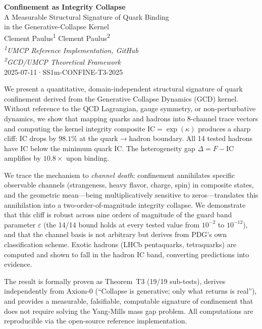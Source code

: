 \documentclass[11pt,a4paper]{article}
\newcommand{\WeldID}{SS1m-CONFINE-T3-2025}
\newcommand{\RevisionDate}{2025-07-11}
\theoremstyle{plain}
\theoremstyle{definition}
\theoremstyle{remark}
\newcommand{\eps}{\varepsilon}
\newcommand{\IC}{\mathrm{IC}}
\begin{document}

\begin{center}
  {\LARGE\bfseries Confinement as Integrity Collapse}\\[6pt]
  {\large A Measurable Structural Signature of Quark Binding\\
   in the Generative-Collapse Kernel}\\[14pt]
  {\normalsize
    Clement Paulus\textsuperscript{1}\enspace
    Clement Paulus\textsuperscript{2}}\\[4pt]
  {\small\itshape
    \textsuperscript{1}UMCP Reference Implementation, GitHub\\
    \textsuperscript{2}GCD/UMCP Theoretical Framework}\\[4pt]
  {\small \RevisionDate\enspace·\enspace\WeldID}
\end{center}

\vspace{4pt}

\begin{tcolorbox}[
  colback=PreambleBox, colframe=CanonLink,
  title=Abstract, fonttitle=\bfseries\small,
  boxrule=0.8pt, arc=2pt, left=8pt, right=8pt
]
\small
We present a quantitative, domain-independent structural
signature of quark confinement derived from the Generative
Collapse Dynamics (GCD) kernel.  Without reference to the
QCD Lagrangian, gauge symmetry, or non-perturbative dynamics,
we show that mapping quarks and hadrons into 8-channel trace
vectors and computing the kernel integrity composite
$\IC = \exp(\kappa)$ produces a sharp cliff: $\IC$ drops by
$98.1\%$ at the quark$\to$hadron boundary.  All 14 tested
hadrons have $\IC$ below the minimum quark $\IC$.  The
heterogeneity gap $\Delta = F - \IC$ amplifies by $10.8\times$
upon binding.

We trace the mechanism to \emph{channel death}:
confinement annihilates specific observable channels
(strangeness, heavy flavor, charge, spin) in composite states,
and the geometric mean---being multiplicatively sensitive to
zeros---translates this annihilation into a two-order-of-magnitude
integrity collapse.  We demonstrate that this cliff is robust
across nine orders of magnitude of the guard band parameter
$\eps$ (the 14/14 bound holds at every tested value from
$10^{-2}$ to $10^{-12}$), and that the channel basis is not
arbitrary but derives from PDG's own classification scheme.
Exotic hadrons (LHCb pentaquarks, tetraquarks) are computed
and shown to fall in the hadron IC band, converting
predictions into evidence.

The result is formally proven as Theorem~T3
(19/19 sub-tests), derives independently
from Axiom-0 (``Collapse is generative; only what returns is
real''), and provides a measurable, falsifiable, computable
signature of confinement that does not require solving the
Yang-Mills mass gap problem.  All computations are reproducible
via the open-source reference implementation.
\end{tcolorbox}
\end{document}

